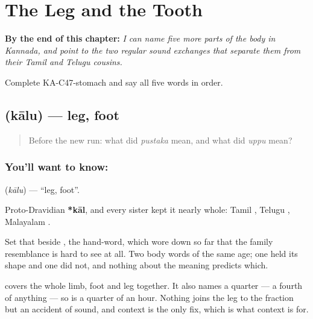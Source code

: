 
\chapter{The Leg and the Tooth}
\label{ch:ka-body-more}

\begin{chapteropening}
\textbf{By the end of this chapter:} \emph{I can name five more parts of the body in Kannada, and point to the two regular sound exchanges that separate them from their Tamil and Telugu cousins.}

Complete KA-C47-stomach and say all five words in order.
\end{chapteropening}

\section[\texorpdfstring{\kn{ಕಾಲು} (kālu)}{ಕಾಲು (kālu)}]{ (kālu) — leg, foot}

\label{lesson:KA-C47-leg}



\begin{quote}
Before the new run: what did \emph{pustaka} mean, and what did \emph{uppu} mean?
\end{quote}

\subsection*{You'll want to know: }
\textbf{} (\emph{kālu}) — \textquotedblleft{}leg, foot\textquotedblright{}.

Proto-Dravidian \textbf{*kāl}, and every sister kept it nearly whole: Tamil , Telugu , Malayalam .

Set that beside , the hand-word, which wore down so far that the family resemblance is hard to see at all. Two body words of the same age; one held its shape and one did not, and nothing about the meaning predicts which.

 covers the whole limb, foot and leg together. It also names a quarter — a fourth of anything — so   is a quarter of an hour. Nothing joins the leg to the fraction but an accident of sound, and context is the only fix, which is what context is for.

